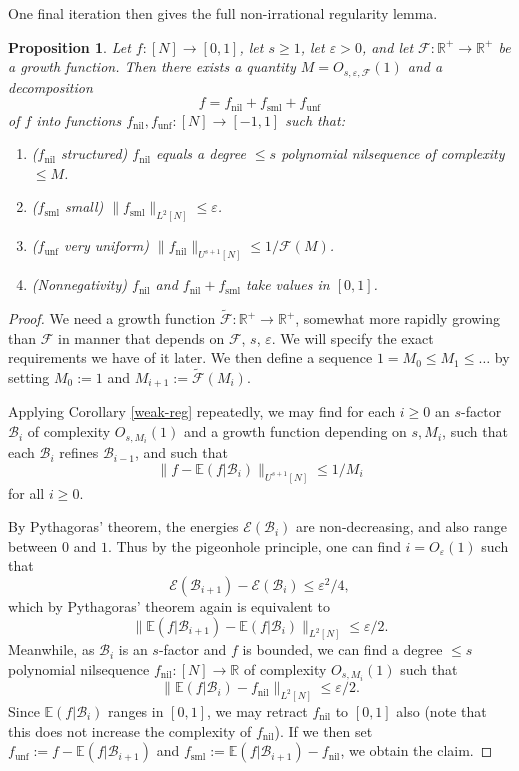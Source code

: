 \documentclass[11pt,reqno]{amsart}
\numberwithin{equation}{section}
\theoremstyle{plain}
\newtheorem{proposition}[subsection]{Proposition}
\theoremstyle{definition}
\renewcommand{\leq}{\leqslant}
\renewcommand{\geq}{\geqslant}
\newcommand\E{{\mathbb{E}}}
\newcommand\R{\mathbb{R}}
\newcommand\B{\mathcal{B}}
\newcommand\1{{\bf 1}}
\newcommand\2{{\bf 2}}
\newcommand\eps{\varepsilon}
\newcommand\nil{{\operatorname{nil}}}
\newcommand\sml{{\operatorname{sml}}}
\newcommand\unf{{\operatorname{unf}}}
\newcommand\Grow{{\mathcal F}}
\begin{document}
One final iteration then gives the full non-irrational regularity lemma.

\begin{proposition}\label{semi-reg}  Let $f: [N] \to [0,1]$, let $s \geq 1$, let $\eps > 0$, and let $\Grow: \R^+ \to \R^+$ be a growth function.  Then there exists a quantity $M = O_{s,\eps,\Grow}(1)$ and a decomposition 
$$ f = f_\nil + f_\sml + f_\unf$$
of $f$ into functions $f_\nil, f_\unf: [N] \to [-1,1]$ such that:
\begin{enumerate}
\item \textup{(}$f_\nil$ structured\textup{)} $f_\nil$ equals a degree $\leq s$ polynomial nilsequence of complexity $\leq M$.
\item \textup{(}$f_\sml$ small\textup{)} $\| f_\sml \|_{L^2[N]} \leq \eps$.
\item \textup{(}$f_\unf$ very uniform\textup{)} $\|f_\nil\|_{U^{s+1}[N]} \leq 1/\Grow(M)$.
\item \textup{(}Nonnegativity\textup{)} $f_\nil$ and $f_\nil + f_\sml$ take values in $[0,1]$.
\end{enumerate}
\end{proposition}
\begin{proof}  We need a growth function $\tilde \Grow: \R^+ \to \R^+$, somewhat more rapidly growing than $\Grow$ in manner that depends on $\Grow$, $s$, $\eps$. We will specify the exact requirements we have of it later.  We then define a sequence $1 = M_0 \leq M_1 \leq \ldots$ by setting $M_0 := 1$ and $M_{i+1} := \tilde \Grow(M_i)$.

Applying Corollary \ref{weak-reg} repeatedly, we may find for each $i \geq 0$ an $s$-factor $\B_i$ of complexity $O_{s,M_i}(1)$ and a growth function depending on $s,M_i$, such that each $\B_i$ refines $\B_{i-1}$, and such that
$$ \| f - \E(f|\B_i) \|_{U^{s+1}[N]} \leq 1/M_i$$
for all $i \geq 0$.

By Pythagoras' theorem, the energies ${\mathcal E}(\B_i)$ are non-decreasing, and also range between $0$ and $1$.  Thus by the pigeonhole principle, one can find $i = O_\eps(1)$ such that
$$ {\mathcal E}(\B_{i+1}) - {\mathcal E}(\B_{i}) \leq \eps^2/4,$$
which by Pythagoras' theorem again is equivalent to
$$ \| \E(f|\B_{i+1}) - \E(f|\B_{i}) \|_{L^2[N]} \leq \eps/2.$$
Meanwhile, as $\B_i$ is an $s$-factor and $f$ is bounded, we can find a degree $\leq s$ polynomial nilsequence $f_\nil: [N] \to \R$ of complexity $O_{s,M_i}(1)$ such that
$$ \| \E(f|\B_{i}) - f_\nil \|_{L^2[N]} \leq \eps/2.$$
Since $\E(f|\B_{i})$ ranges in $[0,1]$, we may retract $f_\nil$ to $[0,1]$ also (note that this does not increase the complexity of $f_\nil$).  If we then set $f_\unf := f -  \E(f|\B_{i+1})$ and $f_\sml :=  \E(f|\B_{i+1}) - f_\nil$, we obtain the claim.
\end{proof}
\end{document}
